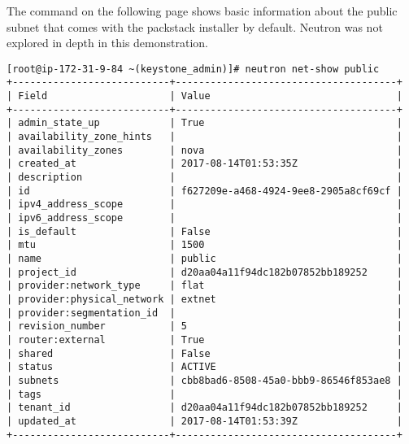 The command on the following page shows basic information about the public
subnet that comes with the packstack installer by default. Neutron was not
explored in depth in this demonstration.

\begin{verbatim}
[root@ip-172-31-9-84 ~(keystone_admin)]# neutron net-show public
+---------------------------+--------------------------------------+
| Field                     | Value                                |
+---------------------------+--------------------------------------+
| admin_state_up            | True                                 |
| availability_zone_hints   |                                      |
| availability_zones        | nova                                 |
| created_at                | 2017-08-14T01:53:35Z                 |
| description               |                                      |
| id                        | f627209e-a468-4924-9ee8-2905a8cf69cf |
| ipv4_address_scope        |                                      |
| ipv6_address_scope        |                                      |
| is_default                | False                                |
| mtu                       | 1500                                 |
| name                      | public                               |
| project_id                | d20aa04a11f94dc182b07852bb189252     |
| provider:network_type     | flat                                 |
| provider:physical_network | extnet                               |
| provider:segmentation_id  |                                      |
| revision_number           | 5                                    |
| router:external           | True                                 |
| shared                    | False                                |
| status                    | ACTIVE                               |
| subnets                   | cbb8bad6-8508-45a0-bbb9-86546f853ae8 |
| tags                      |                                      |
| tenant_id                 | d20aa04a11f94dc182b07852bb189252     |
| updated_at                | 2017-08-14T01:53:39Z                 |
+---------------------------+--------------------------------------+
\end{verbatim}
